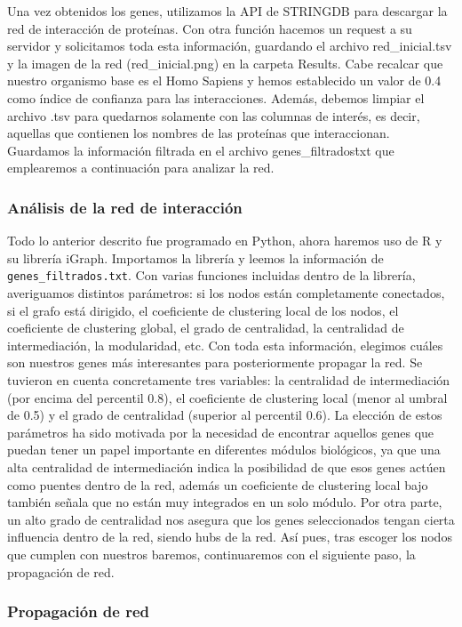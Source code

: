 Una vez obtenidos los genes, utilizamos la API de STRINGDB para descargar la red de interacción de proteínas. Con otra función hacemos un request a su servidor y solicitamos toda esta información, guardando el archivo red\_inicial.tsv y la imagen de la red (red\_inicial.png) en la carpeta Results. Cabe recalcar que nuestro organismo base es el Homo Sapiens y hemos establecido un valor de 0.4 como índice de confianza para las interacciones. Además, debemos limpiar el archivo .tsv para quedarnos solamente con las columnas de interés, es decir, aquellas que contienen los nombres de las proteínas que interaccionan. Guardamos la información filtrada en el archivo genes\_filtrados\.txt que emplearemos a continuación para analizar la red.

\subsubsection{Análisis de la red de interacción}
Todo lo anterior descrito fue programado en Python, ahora haremos uso de R y su librería iGraph. Importamos la librería y leemos la información de \texttt{genes\_filtrados.txt}. Con varias funciones incluidas dentro de la librería, averiguamos distintos parámetros: si los nodos están completamente conectados, si el grafo está dirigido, el coeficiente de clustering local de los nodos, el coeficiente de clustering global, el grado de centralidad, la centralidad de intermediación, la modularidad, etc. Con toda esta información, elegimos cuáles son nuestros genes más interesantes para posteriormente propagar la red. Se tuvieron en cuenta concretamente tres variables: la centralidad de intermediación (por encima del percentil 0.8), el coeficiente de clustering local (menor al umbral de 0.5) y el grado de centralidad (superior al percentil 0.6). La elección de estos parámetros ha sido motivada por la necesidad de encontrar aquellos genes que puedan tener un papel importante en diferentes módulos biológicos, ya que una alta centralidad de intermediación indica la posibilidad de que esos genes actúen como puentes dentro de la red, además un coeficiente de clustering local bajo también señala que no están muy integrados en un solo módulo. Por otra parte, un alto grado de centralidad nos asegura que los genes seleccionados tengan cierta influencia dentro de la red, siendo hubs de la red. Así pues, tras escoger los nodos que cumplen con nuestros baremos, continuaremos con el siguiente paso, la propagación de red.


\subsubsection{Propagación de red}

